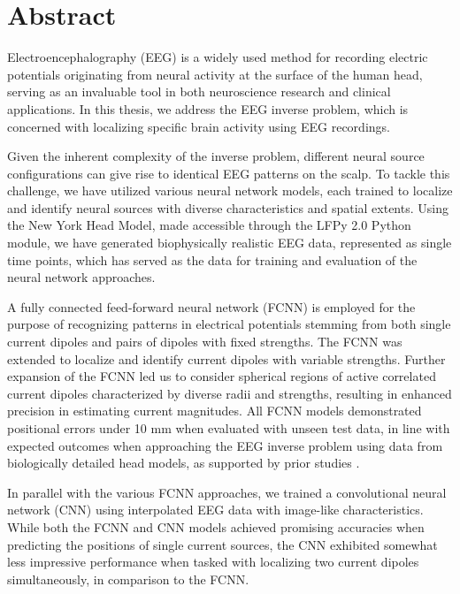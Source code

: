 \documentclass[a4paper, UKenglish, 11pt]{uiomaster}
\begin{document}
\chapter{Abstract}
Electroencephalography (EEG) is a widely used method for recording electric potentials originating from neural activity at the surface of the human head, serving as an invaluable tool in both neuroscience research and clinical applications. In this thesis, we address the EEG inverse problem, which is concerned with localizing specific brain activity using EEG recordings.

Given the inherent complexity of the inverse problem, different neural source configurations can give rise to identical EEG patterns on the scalp. To tackle this challenge, we have utilized various neural network models, each trained to localize and identify neural sources with diverse characteristics and spatial extents. Using the New York Head Model, made accessible through the LFPy 2.0 Python module, we have generated biophysically realistic EEG data, represented as single time points, which has served as the data for training and evaluation of the neural network approaches.

A fully connected feed-forward neural network (FCNN) is employed for the purpose of recognizing patterns in electrical potentials stemming from both single current dipoles and pairs of dipoles with fixed strengths. The FCNN was extended to localize and identify current dipoles with variable strengths. Further expansion of the FCNN led us to consider spherical regions of active correlated current dipoles characterized by diverse radii and strengths, resulting in enhanced precision in estimating current magnitudes. All FCNN models demonstrated positional errors under 10 mm when evaluated with unseen test data, in line with expected outcomes when approaching the EEG inverse problem using data from biologically detailed head models, as supported by prior studies \cite{akalin2013effects, biasiucci2019electroencephalography}.

In parallel with the various FCNN approaches, we trained a convolutional neural network (CNN) using interpolated EEG data with image-like characteristics. While both the FCNN and CNN models achieved promising accuracies when predicting the positions of single current sources, the CNN exhibited somewhat less impressive performance when tasked with localizing two current dipoles simultaneously, in comparison to the FCNN.
\end{document}
